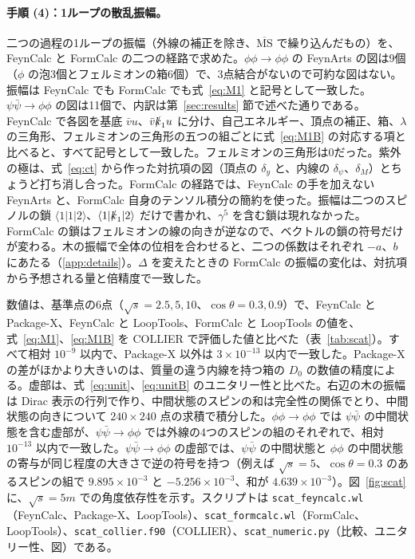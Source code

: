 \documentclass[a4paper,10pt]{ltjsarticle}
\newcommand{\MSbar}{\overline{\mathrm{MS}}}
\begin{document}
\paragraph{手順 (4)：1ループの散乱振幅。}二つの過程の1ループの振幅（外線の補正を除き、$\MSbar$ で繰り込んだもの）を、FeynCalc と FormCalc の二つの経路で求めた。$\phi\phi\to\phi\phi$ の FeynArts の図は9個（$\phi$ の泡3個とフェルミオンの箱6個）で、3点結合がないので可約な図はない。振幅は FeynCalc でも FormCalc でも式~\eqref{eq:M1} と記号として一致した。$\psi\bar\psi\to\phi\phi$ の図は11個で、内訳は第~\ref{sec:results} 節で述べた通りである。FeynCalc で各図を基底 $\bar vu$、$\bar v\slashed k_1u$ に分け、自己エネルギー、頂点の補正、箱、$\lambda$ の三角形、フェルミオンの三角形の五つの組ごとに式~\eqref{eq:M1B} の対応する項と比べると、すべて記号として一致した。フェルミオンの三角形は0だった。紫外の極は、式~\eqref{eq:ct} から作った対抗項の図（頂点の $\delta_y$ と、内線の $\delta_\psi$、$\delta_M$）とちょうど打ち消し合った。FormCalc の経路では、FeynCalc の手を加えない FeynArts と、FormCalc 自身のテンソル積分の簡約を使った。振幅は二つのスピノルの鎖 $\langle1|1|2\rangle$、$\langle1|\slashed k_1|2\rangle$ だけで書かれ、$\gamma^5$ を含む鎖は現れなかった。FormCalc の鎖はフェルミオンの線の向きが逆なので、ベクトルの鎖の符号だけが変わる。木の振幅で全体の位相を合わせると、二つの係数はそれぞれ $-a$、$b$ にあたる（\ref{app:details}）。$\Delta$ を変えたときの FormCalc の振幅の変化は、対抗項から予想される量と倍精度で一致した。

数値は、基準点の6点（$\sqrt s=2.5,5,10$、$\cos\theta=0.3,0.9$）で、FeynCalc と Package-X、FeynCalc と LoopTools、FormCalc と LoopTools の値を、式~\eqref{eq:M1}、\eqref{eq:M1B} を COLLIER で評価した値と比べた（表~\ref{tab:scat}）。すべて相対 $10^{-9}$ 以内で、Package-X 以外は $3\times10^{-13}$ 以内で一致した。Package-X の差がほかより大きいのは、質量の違う内線を持つ箱の $D_0$ の数値の精度による。虚部は、式~\eqref{eq:unit}、\eqref{eq:unitB} のユニタリー性と比べた。右辺の木の振幅は Dirac 表示の行列で作り、中間状態のスピンの和は完全性の関係でとり、中間状態の向きについて $240\times240$ 点の求積で積分した。$\phi\phi\to\phi\phi$ では $\psi\bar\psi$ の中間状態を含む虚部が、$\psi\bar\psi\to\phi\phi$ では外線の4つのスピンの組のそれぞれで、相対 $10^{-13}$ 以内で一致した。$\psi\bar\psi\to\phi\phi$ の虚部では、$\psi\bar\psi$ の中間状態と $\phi\phi$ の中間状態の寄与が同じ程度の大きさで逆の符号を持つ（例えば $\sqrt s=5$、$\cos\theta=0.3$ のあるスピンの組で $9.895\times10^{-3}$ と $-5.256\times10^{-3}$、和が $4.639\times10^{-3}$）。図~\ref{fig:scat} に、$\sqrt s=5m$ での角度依存性を示す。スクリプトは \texttt{scat\_feyncalc.wl}（FeynCalc、Package-X、LoopTools）、\texttt{scat\_formcalc.wl}（FormCalc、LoopTools）、\texttt{scat\_collier.f90}（COLLIER）、\texttt{scat\_numeric.py}（比較、ユニタリー性、図）である。
\end{document}
